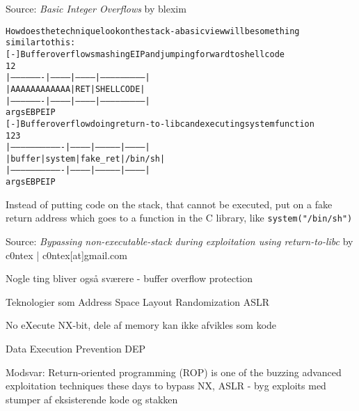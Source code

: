 \documentclass[Screen16to9,17pt]{foils}
\begin{document}
  Source:
  \emph{Basic Integer Overflows} by blexim




\begin{alltt}\footnotesize
  How does the technique look on the stack - a basic view will be something
  similar to this:
  [-] Buffer overflow smashing EIP and jumping forward to shellcode
                                                   1                    2
  |-------------------|-----------|------------|---------------------------|
  |             AAAAAAAAAAAA      |    RET     |        SHELLCODE          |
  |-------------------|-----------|------------|---------------------------|
                     args              EBP        EIP
  [-] Buffer overflow doing return-to-libc and executing system function
                                                    1             2         3
  |-------------------------------|------------|--------------|------------|
  |            buffer             |   system   |   fake_ret   |   /bin/sh  |
  |-------------------------------|------------|--------------|------------|
                     args               EBP        EIP
\end{alltt}
Instead of putting code on the stack, that cannot be executed, put on a fake return address which goes to a function in the C library, like \verb+system("/bin/sh")+

Source:
\emph{Bypassing non-executable-stack during exploitation using return-to-libc}
 by c0ntex | c0ntex[at]gmail.com


\begin{list1}
\item Nogle ting bliver også sværere - buffer overflow protection
\item Teknologier som Address Space Layout Randomization ASLR\\ 
\item No eXecute NX-bit, dele af memory kan ikke afvikles som kode
\item Data Execution Prevention DEP\\
\item Modsvar: Return-oriented programming (ROP) is one of the buzzing advanced exploitation techniques these days to bypass NX, ASLR - byg exploits med stumper af eksisterende kode og stakken
\end{list1}
\end{document}
